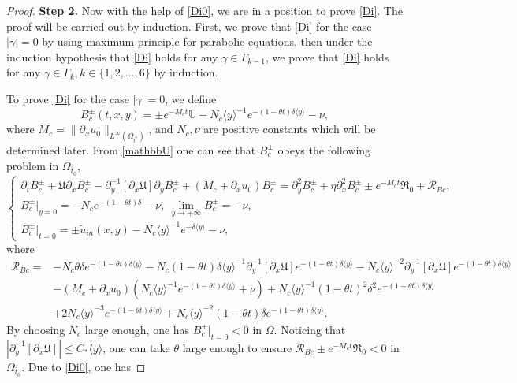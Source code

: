 \documentclass{amsart}
\numberwithin{equation}{section}
\newcommand\y{{{\langle y \rangle}}}
\begin{document}
\begin{proof}
\textbf{Step 2. }Now with the help of \eqref{Di0}, we are in a position to prove \eqref{Di}. The proof will be carried out by induction. First, we prove that \eqref{Di} for the case $|\gamma|=0$ by using maximum principle for parabolic equations, then under the induction hypothesis that \eqref{Di} holds for any $\gamma\in\Gamma_{k-1}$, we prove that \eqref{Di} holds for any $\gamma\in\Gamma_{k}, k\in\{1,2,...,6\}$ by induction.

To prove \eqref{Di} for the case $|\gamma|=0$, we define
$$B_{c}^{\pm}(t,x,y)=\pm e^{-M_{c}t}\mathbb{U}-N_{c}\y^{-1}e^{-(1-\theta t)\delta\y}-\nu,$$
where $M_{c}=\|\partial_{x}u_{0}\|_{L^{\infty}(\Omega_{t^{*}})}$, and $N_{c},\nu$ are positive constants which will be determined later.
From \eqref{mathbbU} one can see that $B_{c}^{\pm}$ obeys the following problem in $\Omega_{\bar{t}_{0}}$,
\begin{equation}\label{BE}
\begin{cases}
\partial_{t}B_{c}^{\pm}
+\mathfrak{U}\partial_{x}B_{c}^{\pm}
-\partial_{y}^{-1}[\partial_{x}\mathfrak{U}]\partial_{y}B_{c}^{\pm}
+(M_{c}+\partial_{x}u_{0})B_{c}^{\pm}
=\partial_{y}^{2}B_{c}^{\pm}+\eta\partial_{x}^{2}B_{c}^{\pm}\pm e^{-M_{c}t}\mathfrak{R}_{0}+\mathcal{R}_{Bc},\\
B_{c}^{\pm}|_{y=0}=-N_{c}e^{-(1-\theta t)\delta}-\nu,~\lim\limits_{y\to+\infty}B_{c}^{\pm}=-\nu,\\
B_{c}^{\pm}|_{t=0}=\pm\tilde{u}_{in}(x,y)-N_{c}\y^{-1}e^{-\delta\y}-\nu,
\end{cases}
\end{equation}
where
\begin{align*}
\mathcal{R}_{Bc}
=&-N_{c}\theta\delta e^{-(1-\theta t)\delta\y}
  -N_{c}(1-\theta t)\delta\y^{-1}\partial_{y}^{-1}[\partial_{x}\mathfrak{U}]e^{-(1-\theta t)\delta\y}
  -N_{c}\y^{-2}\partial_{y}^{-1}[\partial_{x}\mathfrak{U}]e^{-(1-\theta t)\delta\y}\\
 &-(M_{c}+\partial_{x}u_{0})(N_{c}\y^{-1}e^{-(1-\theta t)\delta\y}+\nu)
  +N_{c}\y^{-1}(1-\theta t)^{2}\delta^{2}e^{-(1-\theta t)\delta\y}\\
 &+2N_{c}\y^{-3}e^{-(1-\theta t)\delta\y}
  +N_{c}\y^{-2}(1-\theta t)\delta e^{-(1-\theta t)\delta\y}.
\end{align*}
By choosing $N_{c}$ large enough, one has $B_{c}^{\pm}|_{t=0}<0$ in $\Omega$. Noticing that $|\partial_{y}^{-1}[\partial_{x}\mathfrak{U}]|\leq C_{*}\y$,
one can take $\theta$ large enough to ensure $\mathcal{R}_{Bc}\pm e^{-M_{c}t}\mathfrak{R}_{0}<0$ in $\Omega_{\bar{t}_{0}}$.
Due to \eqref{Di0}, one has

\end{proof}
\end{document}
